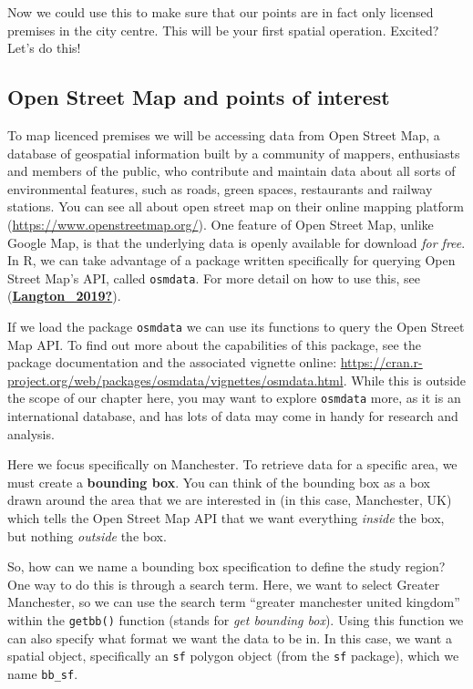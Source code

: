 \documentclass[
]{book}
\begin{document}
Now we could use this to make sure that our points are in fact only licensed premises in the city centre. This will be your first spatial operation. Excited? Let's do this!

\hypertarget{open-street-map-and-points-of-interest}{%
\subsection{Open Street Map and points of interest}\label{open-street-map-and-points-of-interest}}

To map licenced premises we will be accessing data from Open Street Map, a database of geospatial information built by a community of mappers, enthusiasts and members of the public, who contribute and maintain data about all sorts of environmental features, such as roads, green spaces, restaurants and railway stations. You can see all about open street map on their online mapping platform (\url{https://www.openstreetmap.org/}). One feature of Open Street Map, unlike Google Map, is that the underlying data is openly available for download \emph{for free}. In R, we can take advantage of a package written specifically for querying Open Street Map's API, called \texttt{osmdata}. For more detail on how to use this, see (\protect\hyperlink{ref-Langton_2019}{\textbf{Langton\_2019?}}).

If we load the package \texttt{osmdata} we can use its functions to query the Open Street Map API. To find out more about the capabilities of this package, see the package documentation and the associated vignette online: \url{https://cran.r-project.org/web/packages/osmdata/vignettes/osmdata.html}. While this is outside the scope of our chapter here, you may want to explore \texttt{osmdata} more, as it is an international database, and has lots of data may come in handy for research and analysis.

Here we focus specifically on Manchester. To retrieve data for a specific area, we must create a \textbf{bounding box}. You can think of the bounding box as a box drawn around the area that we are interested in (in this case, Manchester, UK) which tells the Open Street Map API that we want everything \emph{inside} the box, but nothing \emph{outside} the box.

So, how can we name a bounding box specification to define the study region? One way to do this is through a search term. Here, we want to select Greater Manchester, so we can use the search term ``greater manchester united kingdom'' within the \texttt{getbb()} function (stands for \emph{get bounding box}). Using this function we can also specify what format we want the data to be in. In this case, we want a spatial object, specifically an \texttt{sf} polygon object (from the \texttt{sf} package), which we name \texttt{bb\_sf}.
\end{document}

